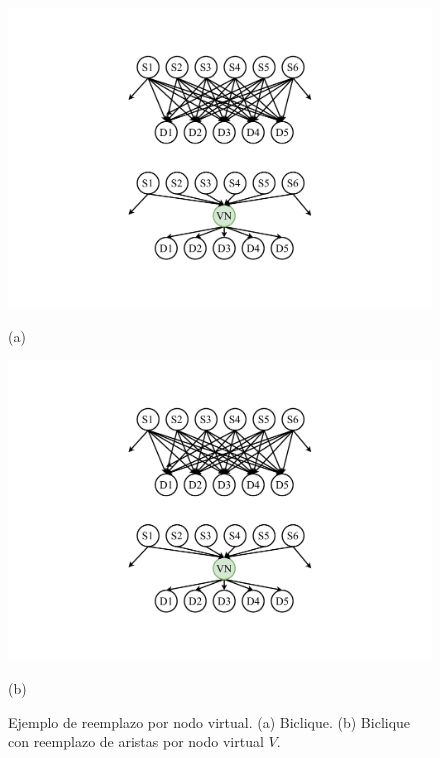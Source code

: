 \begin{figure}%
    	\centering
    	\begin{minipage}{0.45\textwidth}
    		\centering
    		\includegraphics[scale=.4, clip,  trim=230 320 230 80]{img/arte/graphs-virtual2.pdf}
    		
    		(a)
    	\end{minipage}
    	\begin{minipage}{0.45\textwidth}
    		\centering
    		\includegraphics[scale=.4, clip,  trim=230 80 230 320]{img/arte/graphs-virtual2.pdf}
    		
    		(b)
    	\end{minipage}

    \caption{Ejemplo de reemplazo por nodo virtual. (a) Biclique. (b) Biclique con reemplazo de aristas por nodo virtual $V$.}
    \label{fig:virtualNode}
\end{figure}
